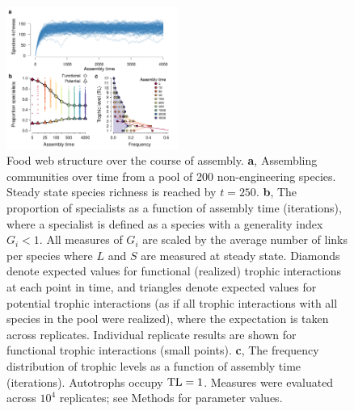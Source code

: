 \documentclass[twocolumn,preprintnumbers,amsmath,amssymb,superscriptaddress,linenumbers]{revtex4-1}
\begin{document}
\vspace{0mm}
\begin{figure}[h!]
\centering
\includegraphics[width=0.5\textwidth]{fig_trophic3.pdf}
\vspace{0mm}
\caption{
Food web structure over the course of assembly.
\textbf{a}, Assembling communities over time from a pool of 200 non-engineering species. 
Steady state species richness is reached by $t=250$.
\textbf{b}, The proportion of specialists as a function of assembly time (iterations), where a specialist is defined as a species with a generality index $G_i < 1$.
All measures of $G_i$ are scaled by the average number of links per species where $L$ and $S$ are measured at steady state.
Diamonds denote expected values for functional (realized) trophic interactions at each point in time, and triangles denote expected values for potential trophic interactions (as if all trophic interactions with all species in the pool were realized), where the expectation is taken across replicates. Individual replicate results are shown for functional trophic interactions (small points).
\textbf{c}, The frequency distribution of trophic levels as a function of assembly time (iterations). 
Autotrophs occupy ${\rm TL}=1$.
Measures were evaluated across $10^4$ replicates; see Methods for parameter values.
\vspace{0mm}
}
\label{fig:trophic}
\end{figure}
\end{document}
